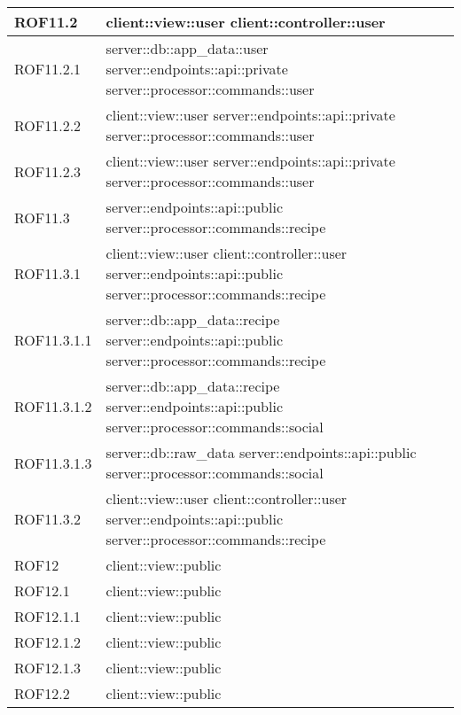 \begin{center}
\begin{longtable}{| p{4cm} | p{8cm} |}
\hline
ROF11.2 & client::view::user \newline client::controller::user \\
\hline
ROF11.2.1 & server::db::app\_data::user \newline server::endpoints::api::private \newline server::processor::commands::user \\
\hline
ROF11.2.2 & client::view::user \newline server::endpoints::api::private \newline server::processor::commands::user \\
\hline
ROF11.2.3 & client::view::user \newline server::endpoints::api::private \newline server::processor::commands::user \\
\hline
ROF11.3 & server::endpoints::api::public \newline server::processor::commands::recipe \\
\hline
ROF11.3.1 & client::view::user \newline client::controller::user \newline server::endpoints::api::public \newline server::processor::commands::recipe \\
\hline
ROF11.3.1.1 & server::db::app\_data::recipe \newline server::endpoints::api::public \newline server::processor::commands::recipe \\
\hline
ROF11.3.1.2 & server::db::app\_data::recipe \newline server::endpoints::api::public \newline server::processor::commands::social \\
\hline
ROF11.3.1.3 & server::db::raw\_data \newline server::endpoints::api::public \newline server::processor::commands::social \\
\hline
ROF11.3.2 & client::view::user \newline client::controller::user \newline server::endpoints::api::public \newline server::processor::commands::recipe \\
\hline
ROF12 & client::view::public \\
\hline
ROF12.1 & client::view::public \\
\hline
ROF12.1.1 & client::view::public \\
\hline
ROF12.1.2 & client::view::public \\
\hline
ROF12.1.3 & client::view::public \\
\hline
ROF12.2 & client::view::public \\
\hline


\end{longtable}
\egroup
\end{center}

